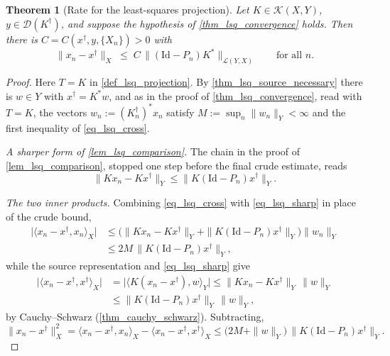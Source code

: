 \documentclass[a4paper]{report}
\theoremstyle{plain}
\newtheorem{theorem}{Theorem}[chapter]
\theoremstyle{definition}
\theoremstyle{remark}
\newcommand{\Ll}{\mathcal{L}}
\newcommand{\Kk}{\mathcal{K}}
\newcommand{\Dom}{\mathcal{D}}
\newcommand{\Id}{\mathrm{Id}}
\newcommand{\dg}{^{\dagger}}
\begin{document}
\begin{theorem}[Rate for the least-squares projection]
  \label{thm_lsq_rate}
  Let $K \in \Kk(X,Y)$, $y \in \Dom(K\dg)$, and suppose the hypothesis of
  \cref{thm_lsq_convergence} holds.  Then there is
  $C = C(x\dg, y, \{X_n\}) > 0$ with
  \[
    \|x_n - x\dg\|_X \;\le\; C\,\bigl\|(\Id - P_n)K^{*}\bigr\|_{\Ll(Y,X)}
    \qquad \text{for all } n .
  \]
\end{theorem}

\begin{proof}
  Here $T = K$ in \cref{def_lsq_projection}.  By \cref{thm_lsq_source_necessary} there
  is $w \in Y$ with $x\dg = K^{*}w$, and as in the proof of \cref{thm_lsq_convergence},
  read with $T = K$, the vectors
  $w_n := (K_n\dg)^{*}x_n$ satisfy $M := \sup_n\|w_n\|_Y < \infty$ and the first
  inequality of \eqref{eq_lsq_cross}.

  \emph{A sharper form of \cref{lem_lsq_comparison}.}  The chain in the proof of
  \cref{lem_lsq_comparison}, stopped one step before the final crude estimate, reads
  \begin{equation}\label{eq_lsq_sharp}
    \|Kx_n - Kx\dg\|_Y \le \|K(\Id - P_n)x\dg\|_Y .
  \end{equation}

  \emph{The two inner products.}  Combining \eqref{eq_lsq_cross} with
  \eqref{eq_lsq_sharp} in place of the crude bound,
  \[
    \begin{aligned}
      \bigl|\langle x_n - x\dg, x_n\rangle_X\bigr|
        &\le \bigl(\|Kx_n - Kx\dg\|_Y + \|K(\Id-P_n)x\dg\|_Y\bigr)\|w_n\|_Y \\
        &\le 2M\,\|K(\Id - P_n)x\dg\|_Y ,
    \end{aligned}
  \]
  while the source representation and \eqref{eq_lsq_sharp} give
  \[
    \begin{aligned}
      \bigl|\langle x_n - x\dg, x\dg\rangle_X\bigr|
        &= \bigl|\langle K(x_n - x\dg), w\rangle_Y\bigr|
          \le \|Kx_n - Kx\dg\|_Y\,\|w\|_Y \\
        &\le \|K(\Id-P_n)x\dg\|_Y\,\|w\|_Y ,
    \end{aligned}
  \]
  by Cauchy--Schwarz (\cref{thm_cauchy_schwarz}).  Subtracting,
  \begin{equation}\label{eq_lsq_rate_sq}
    \|x_n - x\dg\|_X^{2}
      = \langle x_n - x\dg, x_n\rangle_X - \langle x_n - x\dg, x\dg\rangle_X
      \le \bigl(2M + \|w\|_Y\bigr)\,\|K(\Id - P_n)x\dg\|_Y .
  \end{equation}


\end{proof}
\end{document}

